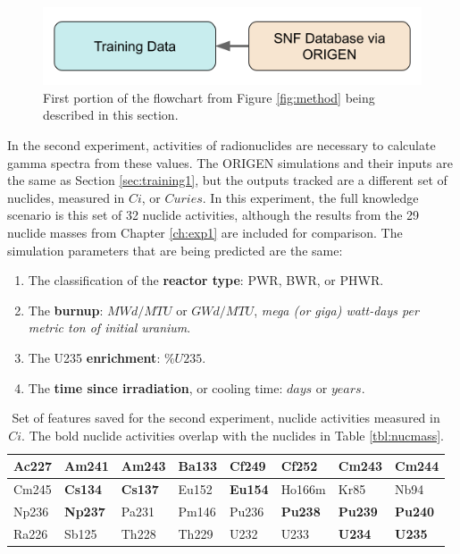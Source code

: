 \begin{figure}[H]
  \centering
  \includegraphics[width=0.7\linewidth]{./chapters/exp1/methodology1.png}
  \caption{First portion of the flowchart from Figure \ref{fig:method} being 
           described in this section.}
\end{figure}

In the second experiment, activities of radionuclides are necessary to
calculate gamma spectra from these values. The \gls{ORIGEN} simulations and
their inputs are the same as Section \ref{sec:training1}, but the outputs
tracked are a different set of nuclides, measured in $Ci$, or $Curies$.  In
this experiment, the full knowledge scenario is this set of 32 nuclide
activities, although the results from the 29 nuclide masses from Chapter
\ref{ch:exp1} are included for comparison. The simulation parameters that
are being predicted are the same:
\begin{enumerate}
  \item The classification of the \textbf{reactor type}: \gls{PWR}, \gls{BWR}, 
        or \gls{PHWR}.
  \item The \textbf{burnup}: $MWd/MTU$ or $GWd/MTU$, \textit{mega (or giga) 
        watt-days per metric ton of initial uranium}.
  \item The \gls{U235} \textbf{enrichment}: $\%U235$. 
  \item The \textbf{time since irradiation}, or cooling time: $days$ or $years$.
\end{enumerate}

\begin{table}[!htb]
  \centering
  \begin{tabular}{@{}|l|l|l|l|l|l|l|l|@{}}
    \hline
    Ac227&\textbf{Am241}&\textbf{Am243}&Ba133&Cf249         &Cf252          &Cm243         &\textbf{Cm244} \\ \hline
    Cm245&\textbf{Cs134}&\textbf{Cs137}&Eu152&\textbf{Eu154}&Ho166m         &Kr85          &Nb94           \\ \hline
    Np236&\textbf{Np237}&Pa231         &Pm146&Pu236         &\textbf{Pu238} &\textbf{Pu239}&\textbf{Pu240} \\ \hline
    Ra226&Sb125         &Th228         &Th229&U232          & U233          &\textbf{U234} &\textbf{U235}  \\ \hline
  \end{tabular}
  \caption{Set of features saved for the second experiment, nuclide activities
           measured in $Ci$. The bold nuclide activities overlap with the 
           nuclides in Table \ref{tbl:nucmass}.}
  \label{tbl:nucacts}
\end{table}

